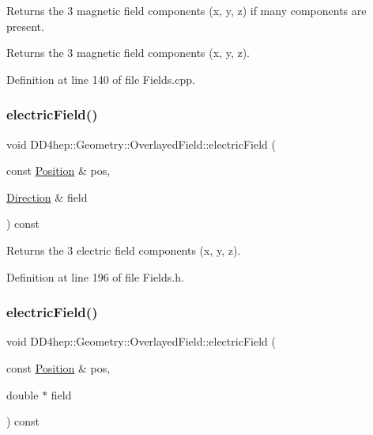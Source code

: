 Returns the 3 magnetic field components (x, y, z) if many components are present. 

Returns the 3 magnetic field components (x, y, z). 

Definition at line 140 of file Fields.\+cpp.

\hypertarget{class_d_d4hep_1_1_geometry_1_1_overlayed_field_a3540b1214a4bfbc9bdc7f1baaafaa811}{}\label{class_d_d4hep_1_1_geometry_1_1_overlayed_field_a3540b1214a4bfbc9bdc7f1baaafaa811} 
\subsubsection{\texorpdfstring{electric\+Field()}{electricField()}\hspace{0.1cm}{\footnotesize\ttfamily [1/3]}}
{\footnotesize\ttfamily void D\+D4hep\+::\+Geometry\+::\+Overlayed\+Field\+::electric\+Field (\begin{DoxyParamCaption}\item[{const \hyperlink{namespace_d_d4hep_1_1_geometry_a55083902099d03506c6db01b80404900}{Position} \&}]{pos,  }\item[{\hyperlink{namespace_d_d4hep_1_1_geometry_a56730a0ddb9f3f089c415cd693bd7c19}{Direction} \&}]{field }\end{DoxyParamCaption}) const\hspace{0.3cm}{\ttfamily [inline]}}



Returns the 3 electric field components (x, y, z). 



Definition at line 196 of file Fields.\+h.

\hypertarget{class_d_d4hep_1_1_geometry_1_1_overlayed_field_a32a1173bdf2c6770f0d43ffb1e3d3bc5}{}\label{class_d_d4hep_1_1_geometry_1_1_overlayed_field_a32a1173bdf2c6770f0d43ffb1e3d3bc5} 
\subsubsection{\texorpdfstring{electric\+Field()}{electricField()}\hspace{0.1cm}{\footnotesize\ttfamily [2/3]}}
{\footnotesize\ttfamily void D\+D4hep\+::\+Geometry\+::\+Overlayed\+Field\+::electric\+Field (\begin{DoxyParamCaption}\item[{const \hyperlink{namespace_d_d4hep_1_1_geometry_a55083902099d03506c6db01b80404900}{Position} \&}]{pos,  }\item[{double $\ast$}]{field }\end{DoxyParamCaption}) const\hspace{0.3cm}{\ttfamily [inline]}}



